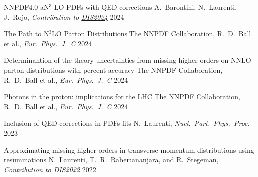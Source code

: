 
\begin{cvhonors}


    \cvhonor
    {NNPDF4.0 aN$^3$ LO PDFs with QED corrections} %
    {A.\ Barontini, N.\ Laurenti, J.\ Rojo, \emph{Contribution to \href{https://inspirehep.net/conferences/2667502?ui-citation-summary=true}{DIS2024}}} %
    {\href{https://inspirehep.net/literature/2794583}{}}
    {2024}
    
    \cvhonor
    {The Path to N$^3$LO Parton Distributions} %
    {The NNPDF Collaboration, R.\ D.\ Ball et al., \emph{Eur.\ Phys.\ J.\ C}} %
    {\href{https://inspirehep.net/literature/2762925}{}}
    {2024}
    
    \cvhonor
    {Determinantion of the theory uncertainties from missing higher orders on NNLO parton distributions with percent accuracy} %
    {The NNPDF Collaboration, R.\ D.\ Ball et al., \emph{Eur.\ Phys.\ J.\ C}} %
    {\vspace{0.35cm}\href{https://inspirehep.net/literature/2749502}{}}
    {\vspace{0.35cm}2024}
    
    \cvhonor
    {Photons in the proton: implications for the LHC} %
    {The NNPDF Collaboration, R.\ D.\ Ball et al., \emph{Eur.\ Phys.\ J.\ C}} %
    {\href{https://inspirehep.net/literature/2747770}{}}
    {2024}

    \cvhonor
    {Inclusion of QED corrections in PDFs ﬁts}
    {N.\ Laurenti, \textit{Nucl.\ Part.\ Phys.\ Proc.}}
    {\href{https://doi.org/10.1016/j.nuclphysbps.2023.11.013}{}}
    {2023}
    
    \cvhonor
    {Approximating missing higher-orders in transverse momentum distributions using resummations}
    {N.~Laurenti, T.\ R.\ Rabemananjara, and R.\ Stegeman, \emph{Contribution to \href{https://inspirehep.net/conferences/1914506?ui-citation-summary=true}{DIS2022}}}
    {\vspace{0.35cm}\href{https://inspirehep.net/literature/2122473}{}}
    {\vspace{0.35cm}2022}

\end{cvhonors}
